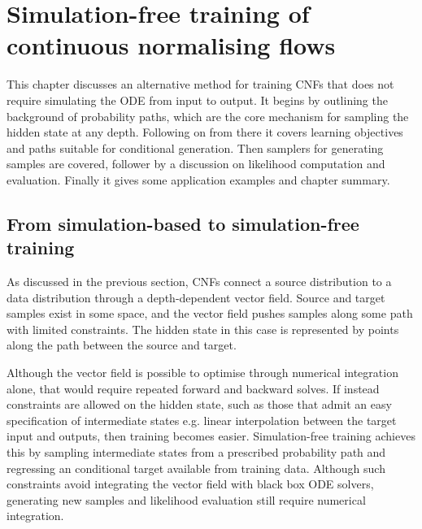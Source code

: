\chapter{Simulation-free training of continuous normalising flows}
\label{ch:simulation-free}

This chapter discusses an alternative method for training \acp{CNF} that does not require simulating the \ac{ODE} from input to output. It begins by outlining the background of probability paths, which are the core mechanism for sampling the hidden state at any depth. Following on from there it covers learning objectives and paths suitable for conditional generation. Then samplers for generating samples are covered, follower by a discussion on likelihood computation and evaluation. Finally it gives some application examples and chapter summary.

\section{From simulation-based to simulation-free training}

As discussed in the previous section, \acp{CNF} connect a source distribution to a data distribution through a depth-dependent vector field. Source and target samples exist in some space, and the vector field pushes samples along some path with limited constraints. The hidden state in this case is represented by points along the path between the source and target.


Although the vector field is possible to optimise through numerical integration alone, that would require repeated forward and backward solves. If instead constraints are allowed on the hidden state, such as those that admit an easy specification of intermediate states e.g. linear interpolation between the target input and outputs, then training becomes easier.  Simulation-free training achieves this by sampling intermediate states from a prescribed probability path and regressing an conditional target available from training data. Although such constraints avoid integrating the vector field with black box \ac{ODE} solvers, generating new samples and likelihood evaluation still require numerical integration.

